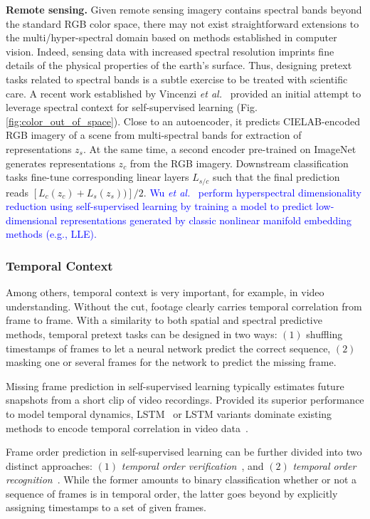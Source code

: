 \documentclass[lettersize,journal]{IEEEtran}
\newcommand{\etal}{\textit{et al.}}
\begin{document}
\textbf{Remote sensing.} Given remote sensing imagery contains spectral bands beyond the standard RGB color space, there may not exist straightforward extensions to the multi/hyper-spectral domain based on methods established in computer vision. Indeed, sensing data with increased spectral resolution imprints fine details of the physical properties of the earth's surface. Thus, designing pretext tasks related to spectral bands is a subtle exercise to be treated with scientific care. A recent work established by Vincenzi \etal~\cite{vincenzi2021color} provided an initial attempt to leverage spectral context for self-supervised learning (Fig. \ref{fig:color_out_of_space}). Close to an autoencoder, it predicts CIELAB-encoded RGB imagery of a scene from multi-spectral bands for extraction of representations $z_s$. At the same time, a second encoder pre-trained on ImageNet generates representations $z_c$ from the RGB imagery. Downstream classification tasks fine-tune corresponding linear layers $L_{s/c}$ such that the final prediction reads $[L_c(z_c)+L_s(z_s))]/2$. \textcolor{blue}{Wu \etal~\cite{wu2021hyper} perform hyperspectral dimensionality reduction using self-supervised learning by training a model to predict low-dimensional representations generated by classic nonlinear manifold embedding methods (e.g., LLE).}


\subsubsection{Temporal Context}

Among others, temporal context is very important, for example, in video understanding. Without the cut, footage clearly carries temporal correlation from frame to frame. With a similarity to both spatial and spectral predictive methods, temporal pretext tasks can be designed in two ways: $(1)$ shuffling timestamps of frames to let a neural network predict the correct sequence, $(2)$ masking one or several frames for the network to predict the missing frame.

Missing frame prediction in self-supervised learning typically estimates future snapshots from a short clip of video recordings. Provided its superior performance to model temporal dynamics, LSTM~\cite{6772729} or LSTM variants dominate existing methods to encode temporal correlation in video data~\cite{srivastava2015unsupervised,villegas2017decomposing,finn2016unsupervised}.

Frame order prediction in self-supervised learning can be further divided into two distinct approaches: $(1)$ \textit{temporal order verification}~\cite{misra2016shuffle,wei2018learning,fernando2017self,misra2016unsupervised}, and $(2)$ \textit{temporal order recognition}~\cite{lee2017unsupervised,xu2019self,kim2019self}. While the former amounts to binary classification whether or not a sequence of frames is in temporal order, the latter goes beyond by explicitly assigning timestamps to a set of given frames. 
\end{document}
